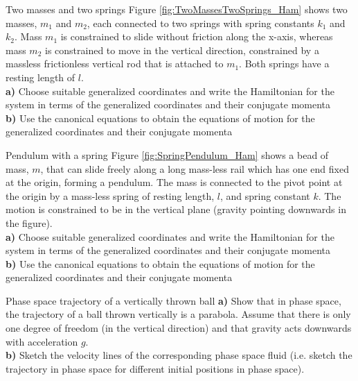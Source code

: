 \begin{problem}{Two masses and two springs}
Figure \ref{fig:TwoMassesTwoSprings_Ham} shows two masses, $m_1$ and $m_2$, each connected to two springs with spring constants $k_1$ and $k_2$. Mass $m_1$ is constrained to slide without friction along the x-axis, whereas mass $m_2$ is constrained to move in the vertical direction, constrained by a massless frictionless vertical rod that is attached to $m_1$. Both springs have a resting length of $l$.
\\
\textbf{a)} Choose suitable generalized coordinates and write the Hamiltonian for the system in terms of the generalized coordinates and their conjugate momenta\\
\textbf{b)} Use the canonical equations to obtain the equations of motion for the generalized coordinates and their conjugate momenta\\
\label{prob_Hamilton_3}
\end{problem}

\begin{problem}{Pendulum with a spring}
Figure \ref{fig:SpringPendulum_Ham} shows a bead of mass, $m$, that can slide freely along a long mass-less rail which has one end fixed at the origin, forming a pendulum. The mass is connected to the pivot point at the origin by a mass-less spring of resting length, $l$, and spring constant $k$. The motion is constrained to be in the vertical plane (gravity pointing downwards in the figure).
\\
\textbf{a)} Choose suitable generalized coordinates and write the Hamiltonian for the system in terms of the generalized coordinates and their conjugate momenta\\
\textbf{b)} Use the canonical equations to obtain the equations of motion for the generalized coordinates and their conjugate momenta\\
\label{prob_Hamilton_4}
\end{problem}

\begin{problem}{Phase space trajectory of a vertically thrown ball}
\textbf{a)} Show that in phase space, the trajectory of a ball thrown vertically is a parabola. Assume that there is only one degree of freedom (in the vertical direction) and that gravity acts downwards with acceleration $g$.\\
\textbf{b)} Sketch the velocity lines of the corresponding phase space fluid (i.e. sketch the trajectory in phase space for different initial positions in phase space).
\label{prob_Hamilton_5}
\end{problem}

